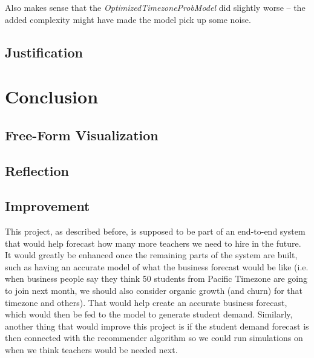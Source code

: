 \documentclass[oneside]{article}
\begin{document}
Also makes sense that the \emph{OptimizedTimezoneProbModel} did slightly
worse -- the added complexity might have made the model pick up some noise.



\subsection{Justification}

\section{Conclusion}
\subsection{Free-Form Visualization}
\subsection{Reflection}
\subsection{Improvement}

This project, as described before, is supposed to be part of an end-to-end
system that would help forecast how many more teachers we need to hire in the
future. It would greatly be enhanced once the remaining parts of the system are
built, such as having an accurate model of what the business forecast would be
like (i.e. when business people say they think 50 students from Pacific
Timezone are going to join next month, we should also consider organic growth
(and churn) for that timezone and others). That would help create an accurate
business forecast, which would then be fed to the model to generate student
demand. Similarly, another thing that would improve this project is if the
student demand forecast is then connected with the recommender algorithm so we
could run simulations on when we think teachers would be needed next.



\end{document}
